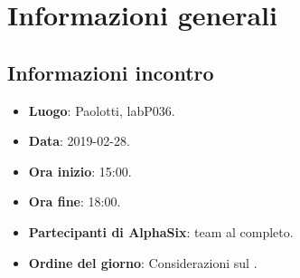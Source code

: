 \newcommand{\documento}{\VI}
\newcommand{\nomedocumentofisico}{VI\_2019-02-28.pdf}
\newcommand{\redazione}{\MM}
\newcommand{\verifica}{\CV}
\newcommand{\approvazione}{\SG}
\newcommand{\versione}{1.0.0}
\newcommand{\uso}{Interno}
\newcommand{\destinateTo}{\gruppo}
\newcommand{\datacreazione}{01 marzo 2019}
\newcommand{\datamodifica}{03 marzo 2019}
\newcommand{\stato}{Approvato}

\def\TABELLE{false}	%
\def\FIGURE{false} 	%






    

    	
    
    \section{Informazioni generali}
		\subsection{Informazioni incontro}
			\begin{itemize}
				\item \textbf{Luogo}: Paolotti, labP036.
				\item \textbf{Data}: 2019-02-28.
				\item \textbf{Ora inizio}: 15:00.
				\item \textbf{Ora fine}: 18:00.
				\item \textbf{Partecipanti di AlphaSix}: team al completo.
				\item \textbf{Ordine del giorno}: Considerazioni sul .
			\end{itemize}

